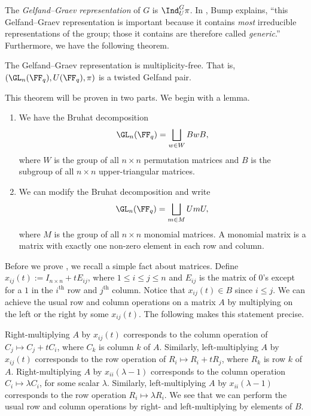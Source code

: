The \emph{Gelfand--Graev representation} of $G$ is $\Ind_U^G \pi$.
In \cite{Bump13}, Bump explains, ``this Gelfand–Graev representation is important because it contains \emph{most} irreducible representations of the group; those it contains are therefore called \emph{generic}.'' Furthermore, we have the following theorem.
\begin{thm}\label{thm: gelf_graev}
    The Gelfand--Graev representation is multiplicity-free.
    That is, $(\GL_n(\FF_q),U(\FF_q),\pi)$ is a twisted Gelfand pair.
\end{thm}
This theorem will be proven in two parts.
We begin with a lemma.
\begin{lem}\label{lemma: bruhat}
    \begin{enumerate}[\itshape(i)]
        \item We have the Bruhat decomposition
              \[
                  \GL_n(\FF_q) = \bigsqcup_{w\in W} BwB,
              \]
              where $W$ is the group of all $n\times n$ permutation matrices and $B$ is the subgroup of all $n\times n$ upper-triangular matrices.
        \item We can modify the Bruhat decomposition and write
              \[
                  \GL_n(\FF_q) = \bigsqcup_{m\in M} UmU,
              \]
              where $M$ is the group of all $n\times n$ monomial matrices.
              A monomial matrix is a matrix with exactly one non-zero element in each row and column.
    \end{enumerate}
\end{lem}
Before we prove , we recall a simple fact about matrices.
Define $x_{ij}(t) := I_{n\times n} + tE_{ij}$, where $1\leq i\leq j\leq n$ and $E_{ij}$ is the matrix of $0$'s except for a $1$ in the $i^\text{th}$ row and $j^\text{th}$ column.
Notice that $x_{ij}(t)\in B$ since $i\leq j$.
We can achieve the usual row and column operations on a matrix $A$ by multiplying on the left or the right by some $x_{ij}(t)$.
The following makes this statement precise.

Right-multiplying $A$ by $x_{ij}(t)$ corresponds to the column operation of $C_j\mapsto C_j+tC_i$, where $C_k$ is column $k$ of $A$.
Similarly, left-multiplying $A$ by $x_{ij}(t)$ corresponds to the row operation of $R_i \mapsto R_i+tR_j$, where $R_k$ is row $k$ of $A$.
Right-multiplying $A$ by $x_{ii}(\lambda-1)$ corresponds to the column operation $C_i\mapsto \lambda C_i$, for some scalar $\lambda$.
Similarly, left-multiplying $A$ by $x_{ii}(\lambda-1)$ corresponds to the row operation $R_i\mapsto\lambda R_i$.
We see that we can perform the usual row and column operations by right- and left-multiplying by elements of $B$.


